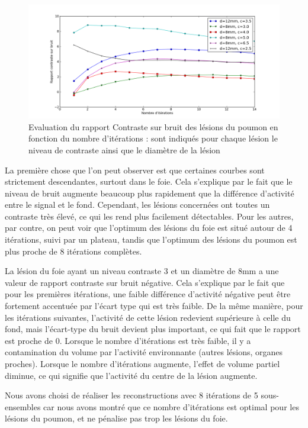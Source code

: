 \begin{figure}
\centering
\includegraphics[width=17cm]{images/CNRPoumon}
\caption[Evaluation du rapport Contraste sur bruit des lésions du poumon en fonction du nombre d'itérations]{Evaluation du rapport Contraste sur bruit des lésions du poumon en fonction du nombre d'itérations : sont indiqués pour chaque lésion le niveau de contraste ainsi que le diamètre de la lésion}
\label{fig:CNRPoumon}
\end{figure}

La première chose que l'on peut observer est que certaines courbes sont strictement descendantes, surtout dans le foie. Cela s'explique par le fait que le niveau de bruit augmente beaucoup plus rapidement que la différence d'activité entre le signal et le fond. Cependant, les lésions concernées ont toutes un contraste très élevé, ce qui les rend plus facilement détectables. Pour les autres, par contre, on peut voir que l'optimum des lésions du foie est situé autour de 4 itérations, suivi par un plateau, tandis que l'optimum des lésions du poumon est plus proche de 8 itérations complètes.

La lésion du foie ayant un niveau contraste 3 et un diamètre de 8mm a une valeur de rapport contraste sur bruit négative. Cela s'explique par le fait que pour les premières itérations, une faible différence d'activité négative peut être fortement accentuée par l'écart type qui est très faible. De la même manière, pour les itérations suivantes, l'activité de cette lésion redevient supérieure à celle du fond, mais l'écart-type du bruit devient plus important, ce qui fait que le rapport est proche de 0. Lorsque le nombre d'itérations est très faible, il y a contamination du volume par l'activité environnante (autres lésions, organes proches). Lorsque le nombre d'itérations augmente, l'effet de volume partiel diminue, ce qui signifie que l'activité du centre de la lésion augmente.

Nous avons choisi de réaliser les reconstructions avec 8 itérations de 5 sous-ensembles car nous avons montré que ce nombre d'itérations est optimal pour les lésions du poumon, et ne pénalise pas trop les lésions du foie.

